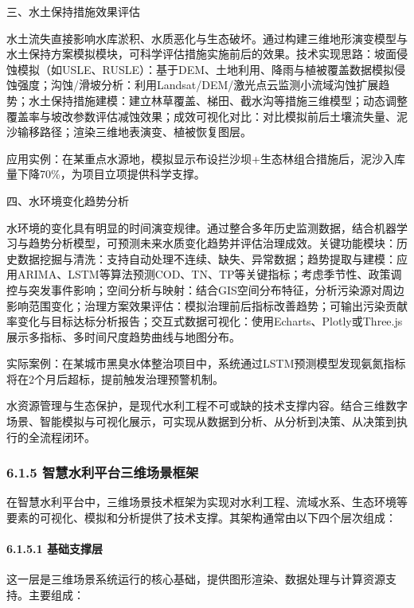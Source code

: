 三、水土保持措施效果评估

水土流失直接影响水库淤积、水质恶化与生态破坏。通过构建三维地形演变模型与水土保持方案模拟模块，可科学评估措施实施前后的效果。技术实现思路：坡面侵蚀模拟（如USLE、RUSLE）：基于DEM、土地利用、降雨与植被覆盖数据模拟侵蚀强度；沟蚀/滑坡分析：利用Landsat/DEM/激光点云监测小流域沟蚀扩展趋势；水土保持措施建模：建立林草覆盖、梯田、截水沟等措施三维模型；动态调整覆盖率与坡改参数评估减蚀效果；成效可视化对比：对比模拟前后土壤流失量、泥沙输移路径；渲染三维地表演变、植被恢复图层。

应用实例：在某重点水源地，模拟显示布设拦沙坝+生态林组合措施后，泥沙入库量下降70\%，为项目立项提供科学支撑。

四、水环境变化趋势分析

水环境的变化具有明显的时间演变规律。通过整合多年历史监测数据，结合机器学习与趋势分析模型，可预测未来水质变化趋势并评估治理成效。关键功能模块：历史数据挖掘与清洗：支持自动处理不连续、缺失、异常数据；趋势提取与建模：应用ARIMA、LSTM等算法预测COD、TN、TP等关键指标；考虑季节性、政策调控与突发事件影响；空间分析与映射：结合GIS空间分布特征，分析污染源对周边影响范围变化；治理方案效果评估：模拟治理前后指标改善趋势；可输出污染贡献率变化与目标达标分析报告；交互式数据可视化：使用Echarts、Plotly或Three.js展示多指标、多时间尺度趋势曲线与地图分布。

实际案例：在某城市黑臭水体整治项目中，系统通过LSTM预测模型发现氨氮指标将在2个月后超标，提前触发治理预警机制。

水资源管理与生态保护，是现代水利工程不可或缺的技术支撑内容。结合三维数字场景、智能模拟与可视化展示，可实现从数据到分析、从分析到决策、从决策到执行的全流程闭环。

\subsubsection{6.1.5 智慧水利平台三维场景框架}\label{ux667aux6167ux6c34ux5229ux5e73ux53f0ux4e09ux7ef4ux573aux666fux6846ux67b6}

在智慧水利平台中，三维场景技术框架为实现对水利工程、流域水系、生态环境等要素的可视化、模拟和分析提供了技术支撑。其架构通常由以下四个层次组成：

\paragraph{6.1.5.1 基础支撑层}\label{ux57faux7840ux652fux6491ux5c42}

这一层是三维场景系统运行的核心基础，提供图形渲染、数据处理与计算资源支持。主要组成：

